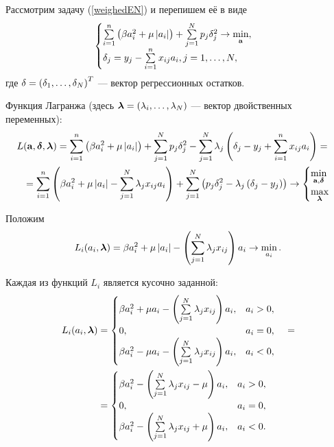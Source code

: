 Рассмотрим задачу (\ref{weighedEN}) и перепишем её в виде
\begin{equation}
	\label{weighedENdelta}
	\begin{cases}
		\sum\limits_{i=1}^n\left(\beta a_i^2 + \mu \left|a_i\right|\right) 
	+ \sum\limits_{j=1}^N p_j\delta_j^2 \to \mathop{\mbox{min}}\limits_{\boldsymbol{\mathbf{a}}}, \\
	\delta_j = y_j - \sum\limits_{i=1}^nx_{ij}a_i, j=1,\ldots,N,
	\end{cases}
\end{equation}
где $\delta = \left(\delta_1, \ldots, \delta_N\right)^T$ --- вектор регрессионных остатков.

Функция Лагранжа (здесь $\boldsymbol{\mathbf{\lambda}} = \left(\lambda_{i},\ldots,\lambda_{N}\right)$ --- вектор двойственных переменных):
\begin{equation}
	\label{LagrWEN}
	\begin{split}
		L&(\boldsymbol{\mathbf{a}}, \boldsymbol{\mathbf{\delta}}, \boldsymbol{\mathbf{\lambda}}) 
	= \sum\limits_{i=1}^n\left(\beta a_i^2 + \mu \left|a_i\right|\right) + \sum\limits_{j=1}^N p_j\delta_j^2 - \sum_{j=1}^N\lambda_j\left(\delta_j - y_j + \sum\limits_{i=1}^nx_{ij}a_i\right) = \\
	&= \sum\limits_{i=1}^n\left(\beta a_i^2 + \mu \left|a_i\right| - \sum\limits_{j=1}^N\lambda_jx_{ij}a_i\right) + \sum\limits_{j=1}^N \left(p_j\delta_j^2  - \lambda_j\left(\delta_j - y_j\right)\right) \to 
	\begin{cases}
		\mathop{\mbox{min}}\limits_{\boldsymbol{\mathbf{a}}, \boldsymbol{\mathbf{\delta}}}\\
		\mathop{\mbox{max}}\limits_{\boldsymbol{\mathbf{\lambda}}}\\
	\end{cases}
	\end{split}
\end{equation}

Положим 
\begin{equation}
	\label{partialLagr}
	L_i(a_i,\boldsymbol{\mathbf{\lambda}}) = \beta a_i^2 + \mu \left|a_i\right| - \left(\sum\limits_{j=1}^N\lambda_jx_{ij}\right)a_i \to \mathop{\mbox{min}}\limits_{a_i}.
\end{equation}

Каждая из функций $L_i$ является кусочно заданной:
\begin{equation}
	\label{partialLagrParted}
	\begin{split}
		L_i(a_i,\boldsymbol{\mathbf{\lambda}}) 
		&= \begin{cases}
			\beta a_i^2 + \mu a_i - \left(\sum\limits_{j=1}^N\lambda_jx_{ij}\right)a_i, &a_i > 0,\\
			0, &a_i = 0,\\
			\beta a_i^2 - \mu a_i - \left(\sum\limits_{j=1}^N\lambda_jx_{ij}\right)a_i, &a_i < 0,\\
		\end{cases} \quad= \\
		&= \begin{cases}
			\beta a_i^2 - \left(\sum\limits_{j=1}^N\lambda_jx_{ij}-\mu\right)a_i, &a_i > 0,\\
			0, &a_i = 0,\\
			\beta a_i^2 - \left(\sum\limits_{j=1}^N\lambda_jx_{ij}+\mu\right)a_i, &a_i < 0.\\
		\end{cases}	
	\end{split}
\end{equation}

